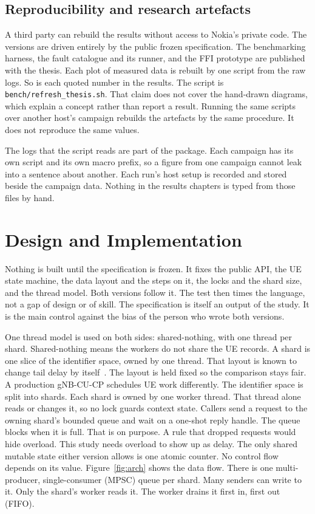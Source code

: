 \documentclass[english,oneside,a4paper,censored,csm,software-track-2020]{HYthesisML}
\begin{document}
\section{Reproducibility and research artefacts}\label{sec:repro}
A third party can rebuild the results without access to Nokia's private code.
The versions are driven entirely by the public frozen specification.
The benchmarking harness, the fault catalogue and its runner, and the FFI prototype are published with the thesis.
Each plot of measured data is rebuilt by one script from the raw logs.
So is each quoted number in the results.
The script is \texttt{bench/refresh\_thesis.sh}.
That claim does not cover the hand-drawn diagrams, which explain a concept rather than report a result.
Running the same scripts over another host's campaign rebuilds the artefacts by the same procedure. It does not reproduce the same values.

The logs that the script reads are part of the package.
Each campaign has its own script and its own macro prefix, so a figure from one campaign cannot leak into a sentence about another.
Each run's host setup is recorded and stored beside the campaign data.
Nothing in the results chapters is typed from those files by hand.

\chapter{Design and Implementation\label{chapter:design}}

Nothing is built until the specification is frozen.
It fixes the public API, the UE state machine, the data layout and the steps on it, the locks and the shard size, and the thread model.
Both versions follow it.
The test then times the language, not a gap of design or of skill.
The specification is itself an output of the study.
It is the main control against the bias of the person who wrote both versions.

One thread model is used on both sides: shared-nothing, with one thread per shard.
Shared-nothing means the workers do not share the UE records.
A shard is one slice of the identifier space, owned by one thread.
That layout is known to change tail delay by itself~\cite{enberg2019threadpercore}.
The layout is held fixed so the comparison stays fair.
A production gNB-CU-CP schedules UE work differently.
The identifier space is split into shards.
Each shard is owned by one worker thread.
That thread alone reads or changes it, so no lock guards context state.
Callers send a request to the owning shard's bounded queue and wait on a one-shot reply handle.
The queue blocks when it is full. That is on purpose.
A rule that dropped requests would hide overload.
This study needs overload to show up as delay.
The only shared mutable state either version allows is one atomic counter.
No control flow depends on its value.
Figure~\ref{fig:arch} shows the data flow.
There is one multi-producer, single-consumer (MPSC) queue per shard.
Many senders can write to it. Only the shard's worker reads it.
The worker drains it first in, first out (FIFO).
\end{document}
